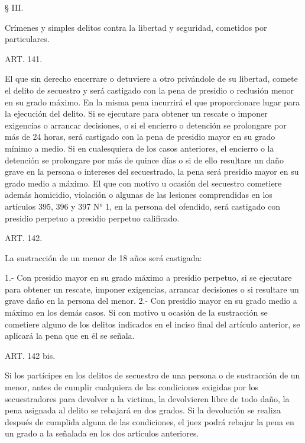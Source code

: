     § III.

    Crímenes y simples delitos contra la libertad y seguridad, cometidos por particulares.





    ART. 141.

    El que sin derecho encerrare o detuviere a otro privándole de su libertad, comete el delito de secuestro y será castigado con la pena de presidio o reclusión menor en su grado máximo.
    En la misma pena incurrirá el que proporcionare lugar para la ejecución del delito.
    Si se ejecutare para obtener un rescate o imponer exigencias o arrancar decisiones, o si el encierro o detención se prolongare por más de 24 horas, será castigado con la pena de presidio mayor en su grado mínimo a medio.
    Si en cualesquiera de los casos anteriores, el encierro o la detención se prolongare por más de quince días o si de ello resultare un daño grave en la persona o intereses del secuestrado, la pena será presidio mayor en su grado medio a máximo.
    El que con motivo u ocasión del secuestro cometiere además homicidio, violación o algunas de las lesiones comprendidas en los artículos 395, 396 y 397 N° 1, en la persona del ofendido, será castigado con presidio perpetuo a presidio perpetuo calificado.






    ART. 142.

    La sustracción de un menor de 18 años será castigada:

    1.- Con presidio mayor en su grado máximo a presidio perpetuo, si se ejecutare para obtener un rescate, imponer exigencias, arrancar decisiones o si resultare un grave daño en la persona del menor.
    2.- Con presidio mayor en su grado medio a máximo en los demás casos.
    Si con motivo u ocasión de la sustracción se cometiere alguno de los delitos indicados en el inciso final del artículo anterior, se aplicará la pena que en él se señala.


    ART. 142 bis.

    Si los partícipes en los delitos de secuestro de una persona o de sustracción de un menor, antes de cumplir cualquiera de las condiciones exigidas por los secuestradores para devolver a la victima, la devolvieren libre de todo daño, la pena asignada al delito se rebajará en dos grados. Si la devolución se realiza después de cumplida alguna de las condiciones, el juez podrá rebajar la pena en un grado a la señalada en los dos artículos anteriores.


